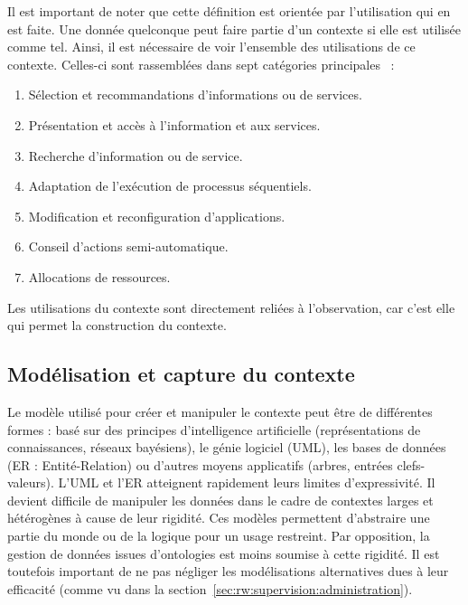 Il est important de noter que cette définition est orientée par l'utilisation qui en est faite. Une donnée quelconque peut faire partie d'un contexte si elle est utilisée comme tel. Ainsi, il est nécessaire de voir l'ensemble des utilisations de ce contexte. Celles-ci sont rassemblées dans sept catégories principales~\cite{Soylu:context} : 
\begin{enumerate}
	\item Sélection et recommandations d'informations ou de services.
	\item Présentation et accès à l'information et aux services.
	\item Recherche d'information ou de service.
	\item Adaptation de l'exécution de processus séquentiels.
	\item Modification et reconfiguration d'applications.
	\item Conseil d'actions semi-automatique.
	\item Allocations de ressources.
\end{enumerate}
Les utilisations du contexte sont directement reliées à l'observation, car c'est elle qui permet la construction du contexte.

\subsection{Modélisation et capture du contexte}
Le modèle utilisé pour créer et manipuler le contexte peut être de différentes formes : basé sur des principes d'intelligence artificielle (représentations de connaissances, réseaux bayésiens), le génie logiciel (UML), les bases de données (ER : Entité-Relation) ou d'autres moyens applicatifs (arbres, entrées clefs-valeurs). L'UML et l'ER atteignent rapidement leurs limites d'expressivité. Il devient difficile de manipuler les données dans le cadre de contextes larges et hétérogènes à cause de leur rigidité. Ces modèles permettent d'abstraire une partie du monde ou de la logique pour un usage restreint. Par opposition, la gestion de données issues d'ontologies est moins soumise à cette rigidité. Il est toutefois important de ne pas négliger les modélisations alternatives dues à leur efficacité (comme vu dans la section~\ref{sec:rw:supervision:administration}).


